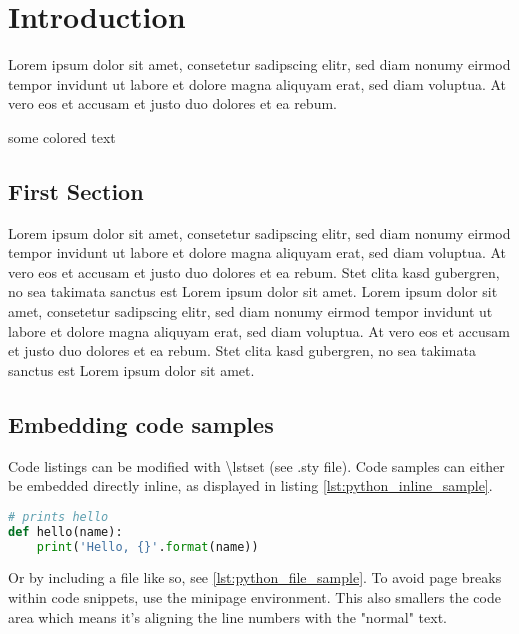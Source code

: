 \chapter{Introduction}
Lorem ipsum dolor sit amet, consetetur sadipscing elitr, sed diam nonumy eirmod tempor invidunt ut labore et dolore magna aliquyam erat, sed diam voluptua. At vero eos et accusam et justo duo dolores et ea rebum. \cite{Abedon2003}

{\color{red}some colored text}

\section{First Section}
Lorem ipsum dolor sit amet, consetetur sadipscing elitr, sed diam nonumy eirmod tempor invidunt ut labore et dolore magna aliquyam erat, sed diam voluptua. At vero eos et accusam et justo duo dolores et ea rebum. Stet clita kasd gubergren, no sea takimata sanctus est Lorem ipsum dolor sit amet. Lorem ipsum dolor sit amet, consetetur sadipscing elitr, sed diam nonumy eirmod tempor invidunt ut labore et dolore magna aliquyam erat, sed diam voluptua. At vero eos et accusam et justo duo dolores et ea rebum. Stet clita kasd gubergren, no sea takimata sanctus est Lorem ipsum dolor sit amet. \cite{Goossens1993}

\section{Embedding code samples}
Code listings can be modified with \textbackslash lstset (see .sty file). Code samples can either be embedded directly inline, as displayed in listing \ref{lst:python_inline_sample}.

\begin{minipage}{\linewidth}
\begin{lstlisting}[caption={Python hello function.},captionpos=b,language=python,label=lst:python_inline_sample]
# prints hello
def hello(name):
    print('Hello, {}'.format(name))
\end{lstlisting}
\end{minipage}
%
Or by including a file like so, see \ref{lst:python_file_sample}. To avoid page breaks within code snippets, use the minipage environment. This also smallers the code area which means it's aligning the line numbers with the "normal" text.

\begin{minipage}{\linewidth}

\end{minipage}

%




